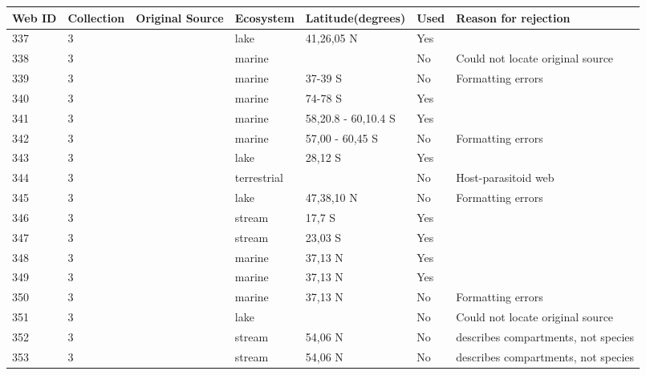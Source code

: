 \documentclass[12pt]{article}
\begin{document}
\begin{landscape}
    \begin{table}[h!]
    \centering
    {\footnotesize
      \begin{tabular}{p{2.8cm}p{1.3cm}p{3cm}p{2.2cm}p{2.5cm}lp{8.2cm}}
        \hline
        Web ID & Collection & Original Source & Ecosystem & Latitude(degrees) & Used  & Reason for rejection  \\
        \hline
        337   & 3 & \cite{Alcorlo2001}  & lake  & 41,26,05 N & Yes   &       \\
        338   & 3 & \cite{Torres2013}  & marine &       & No    & Could not locate original source \\
        339   & 3 & \cite{Bulman2001}  & marine & 37-39 S & No  &  Formatting errors     \\
        340   & 3 & \cite{Smith2007}  & marine & 74-78 S & Yes   &       \\
        341   & 3 & \cite{Lancraft1991}  & marine & 58,20.8 - 60,10.4 S & Yes   &       \\
        342   & 3 & \cite{Hopkins1993}  & marine & 57,00 - 60,45 S & No  &  Formatting errors     \\
        343   & 3 & \cite{Kitching1987}  & lake  & 28,12 S & Yes   &       \\
        344   & 3 & \cite{Hodkinson2004}  & terrestrial &       & No    & Host-parasitoid web \\
        345   & 3 & \cite{Boit2012}  & lake  & 47,38,10 N & No  &  Formatting errors     \\
        346   & 3 & \cite{Rayner2010}  & stream & 17,7 S & Yes   &       \\
        347   & 3 & \cite{Motta2005}  & stream & 23,03 S & Yes   &       \\
        348   & 3 & \cite{Douglass2011}    & marine & 37,13 N & Yes   &       \\
        349   & 3 & \cite{Douglass2011}    & marine & 37,13 N & Yes   &       \\
        350   & 3 & \cite{Douglass2011}    & marine & 37,13 N & No  &  Formatting errors     \\
        351   & 3 & \cite{Warren1989}     & lake  &       & No    & Could not locate original source \\
        352   & 3 & \cite{Poepperl2003}  & stream & 54,06 N & No    & describes compartments, not species \\
        353   & 3 & \cite{Poepperl2003}  & stream & 54,06 N & No    & describes compartments, not species \\

\end{tabular}}
\end{table}
\end{landscape}
\end{document}
